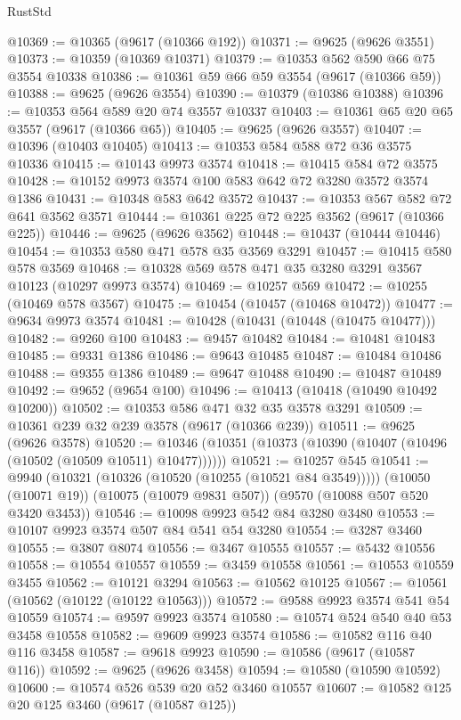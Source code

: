 \begin{lexlean}{RustStd}
\begin{coremodule}
{\begin{coremodule}
{{{{{{{{{{{{{{{{{{{{{{{{{{{{{{{{{@10369 := @10365 (@9617 (@10366 @192))
@10371 := @9625 (@9626 @3551)
@10373 := @10359 (@10369 @10371)
@10379 := @10353 @562 @590 @66 @75 @3554 @10338
@10386 := @10361 @59 @66 @59 @3554 (@9617 (@10366 @59))
@10388 := @9625 (@9626 @3554)
@10390 := @10379 (@10386 @10388)
@10396 := @10353 @564 @589 @20 @74 @3557 @10337
@10403 := @10361 @65 @20 @65 @3557 (@9617 (@10366 @65))
@10405 := @9625 (@9626 @3557)
@10407 := @10396 (@10403 @10405)
@10413 := @10353 @584 @588 @72 @36 @3575 @10336
@10415 := @10143 @9973 @3574
@10418 := @10415 @584 @72 @3575
@10428 := @10152 @9973 @3574 @100 @583 @642 @72 @3280 @3572 @3574 @1386
@10431 := @10348 @583 @642 @3572
@10437 := @10353 @567 @582 @72 @641 @3562 @3571
@10444 := @10361 @225 @72 @225 @3562 (@9617 (@10366 @225))
@10446 := @9625 (@9626 @3562)
@10448 := @10437 (@10444 @10446)
@10454 := @10353 @580 @471 @578 @35 @3569 @3291
@10457 := @10415 @580 @578 @3569
@10468 := @10328 @569 @578 @471 @35 @3280 @3291 @3567 @10123 (@10297 @9973 @3574)
@10469 := @10257 @569
@10472 := @10255 (@10469 @578 @3567)
@10475 := @10454 (@10457 (@10468 @10472))
@10477 := @9634 @9973 @3574
@10481 := @10428 (@10431 (@10448 (@10475 @10477)))
@10482 := @9260 @100
@10483 := @9457 @10482
@10484 := @10481 @10483
@10485 := @9331 @1386
@10486 := @9643 @10485
@10487 := @10484 @10486
@10488 := @9355 @1386
@10489 := @9647 @10488
@10490 := @10487 @10489
@10492 := @9652 (@9654 @100)
@10496 := @10413 (@10418 (@10490 @10492 @10200))
@10502 := @10353 @586 @471 @32 @35 @3578 @3291
@10509 := @10361 @239 @32 @239 @3578 (@9617 (@10366 @239))
@10511 := @9625 (@9626 @3578)
@10520 := @10346 (@10351 (@10373 (@10390 (@10407 (@10496 (@10502 (@10509 @10511) @10477))))))
@10521 := @10257 @545
@10541 := @9940
    (@10321 (@10326 (@10520 (@10255 (@10521 @84 @3549)))))
    (@10050 (@10071 @19))
    (@10075 (@10079 @9831 @507))
    (@9570 (@10088 @507 @520 @3420 @3453))
@10546 := @10098 @9923 @542 @84 @3280 @3480
@10553 := @10107 @9923 @3574 @507 @84 @541 @54 @3280
@10554 := @3287 @3460
@10555 := @3807 @8074
@10556 := @3467 @10555
@10557 := @5432 @10556
@10558 := @10554 @10557
@10559 := @3459 @10558
@10561 := @10553 @10559 @3455
@10562 := @10121 @3294
@10563 := @10562 @10125
@10567 := @10561 (@10562 (@10122 (@10122 @10563)))
@10572 := @9588 @9923 @3574 @541 @54 @10559
@10574 := @9597 @9923 @3574
@10580 := @10574 @524 @540 @40 @53 @3458 @10558
@10582 := @9609 @9923 @3574
@10586 := @10582 @116 @40 @116 @3458
@10587 := @9618 @9923
@10590 := @10586 (@9617 (@10587 @116))
@10592 := @9625 (@9626 @3458)
@10594 := @10580 (@10590 @10592)
@10600 := @10574 @526 @539 @20 @52 @3460 @10557
@10607 := @10582 @125 @20 @125 @3460 (@9617 (@10587 @125))
}}}}}}}}}}}}}}}}}}}}}}}}}}}}}}}}}
\end{coremodule}}
\end{coremodule}
\end{lexlean}
